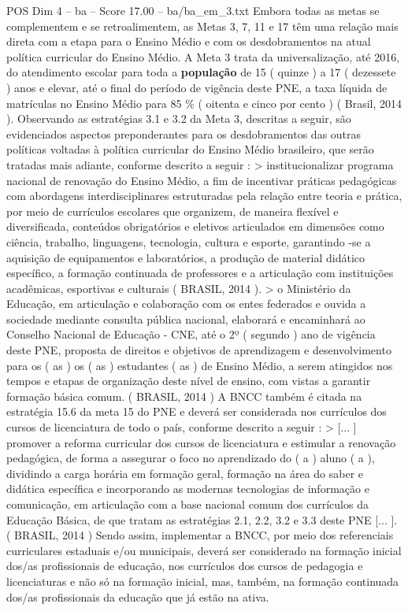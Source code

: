 \begin{textsample}{POS Dim 4 – ba – Score 17.00 – ba/ba\_em\_3.txt}
Embora todas as metas se complementem e se retroalimentem, as Metas 3, 7, 11 e 17 têm uma relação mais direta com a etapa para o Ensino Médio e com os desdobramentos na atual política curricular do Ensino Médio.
A Meta 3 trata da universalização, até 2016, do atendimento escolar para toda a \textbf{população} de 15 ( quinze ) a 17 ( dezessete ) anos e elevar, até o final do período de vigência deste PNE, a taxa líquida de matrículas no Ensino Médio para 85 \% ( oitenta e cinco por cento ) ( Brasil, 2014 ).
Observando as estratégias 3.1 e 3.2 da Meta 3, descritas a seguir, são evidenciados aspectos preponderantes para os desdobramentos das outras políticas voltadas à política curricular do Ensino Médio brasileiro, que serão tratadas mais adiante, conforme descrito a seguir : > institucionalizar programa nacional de renovação do Ensino Médio, a fim de incentivar práticas pedagógicas com abordagens interdisciplinares estruturadas pela relação entre teoria e prática, por meio de currículos escolares que organizem, de maneira flexível e diversificada, conteúdos obrigatórios e eletivos articulados em dimensões como ciência, trabalho, linguagens, tecnologia, cultura e esporte, garantindo -se a aquisição de equipamentos e laboratórios, a produção de material didático específico, a formação continuada de professores e a articulação com instituições acadêmicas, esportivas e culturais ( BRASIL, 2014 ). > o Ministério da Educação, em articulação e colaboração com os entes federados e ouvida a sociedade mediante consulta pública nacional, elaborará e encaminhará ao Conselho Nacional de Educação - CNE, até o 2º ( segundo ) ano de vigência deste PNE, proposta de direitos e objetivos de aprendizagem e desenvolvimento para os ( as ) os ( as ) estudantes ( as ) de Ensino Médio, a serem atingidos nos tempos e etapas de organização deste nível de ensino, com vistas a garantir formação básica comum. ( BRASIL, 2014 ) A BNCC também é citada na estratégia 15.6 da meta 15 do PNE e deverá ser considerada nos currículos dos cursos de licenciatura de todo o país, conforme descrito a seguir : > [... ] promover a reforma curricular dos cursos de licenciatura e estimular a renovação pedagógica, de forma a assegurar o foco no aprendizado do ( a ) aluno ( a ), dividindo a carga horária em formação geral, formação na área do saber e didática específica e incorporando as modernas tecnologias de informação e comunicação, em articulação com a base nacional comum dos currículos da Educação Básica, de que tratam as estratégias 2.1, 2.2, 3.2 e 3.3 deste PNE [... ]. ( BRASIL, 2014 ) Sendo assim, implementar a BNCC, por meio dos referenciais curriculares estaduais e/ou municipais, deverá ser considerado na formação inicial dos/as profissionais de educação, nos currículos dos cursos de pedagogia e licenciaturas e não só na formação inicial, mas, também, na formação continuada dos/as profissionais da educação que já estão na ativa.

\end{textsample}
